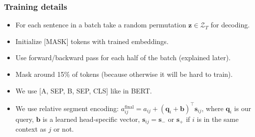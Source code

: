 \documentclass[10pt]{beamer}
\begin{document}
\begin{frame}
    \frametitle{Training details}
    \begin{itemize}
        \item\pause For each sentence in a batch take a random permutation $\bm z \in \mathcal{Z}_T$ for decoding.
        \item\pause Initialize [MASK] tokens with trained embeddings.
        \item\pause Use forward/backward pass for each half of the batch (explained later).
        \item\pause Mask around 15\% of tokens (because otherwise it will be hard to train).
        \item\pause We use [A, SEP, B, SEP, CLS] like in BERT.
        \item\pause We use relative segment encoding: $a_{ij}^{\text{final}} = a_{ij} + (\bm q_i + \bm b)^\top \bm s_{ij}$, where $\bm q_i$ is our query, $\bm b$ is a learned head-specific vector, $\bm s_{ij} = \bm s_-$ or $\bm s_+$ if $i$ is in the same context as $j$ or not.
    \end{itemize}
\end{frame}
\end{document}
